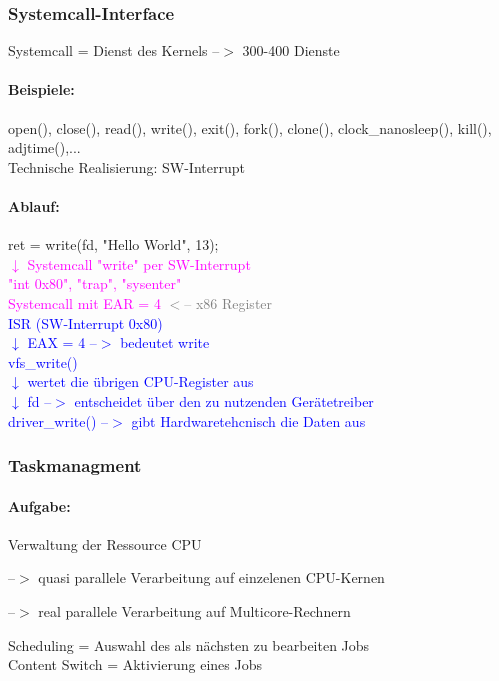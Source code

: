 \documentclass[12pt,a4paper,oneside,ngerman]{article}
\begin{document}
\subsubsection{Systemcall-Interface}
Systemcall = Dienst des Kernels --$>$ 300-400 Dienste

\paragraph{Beispiele:}
open(), close(), read(), write(), exit(), fork(), clone(), clock\_nanosleep(), kill(), adjtime(),...\\
Technische Realisierung: SW-Interrupt

\paragraph{Ablauf:}
ret = write(fd, "Hello World", 13);\\
\textcolor{magenta}{ $\downarrow$ Systemcall "write" per SW-Interrupt}\\
\textcolor{magenta}{"int 0x80", "trap", "sysenter"}\\
\textcolor{magenta}{Systemcall mit EAR = 4} \textcolor{gray}{ $<$-- x86 Register} \\

\textcolor{blue}{ISR (SW-Interrupt 0x80) } \\
\textcolor{blue}{$\downarrow$ EAX = 4 --$>$ bedeutet write } \\
\textcolor{blue}{vfs\_write()} \\
\textcolor{blue}{$\downarrow$ wertet die übrigen CPU-Register aus } \\
\textcolor{blue}{$\downarrow$ fd --$>$ entscheidet über den zu nutzenden Gerätetreiber } \\
\textcolor{blue}{driver\_write() --$>$ gibt Hardwaretehcnisch die Daten aus} \\

\subsubsection{Taskmanagment}
\paragraph{Aufgabe:}
Verwaltung der Ressource CPU
\begin{description}
	\item --$>$ quasi parallele Verarbeitung auf einzelenen CPU-Kernen
	\item --$>$ real parallele Verarbeitung auf Multicore-Rechnern
\end{description}
Scheduling = Auswahl des als nächsten zu bearbeiten Jobs \\
Content Switch = Aktivierung eines Jobs \\
\end{document}
